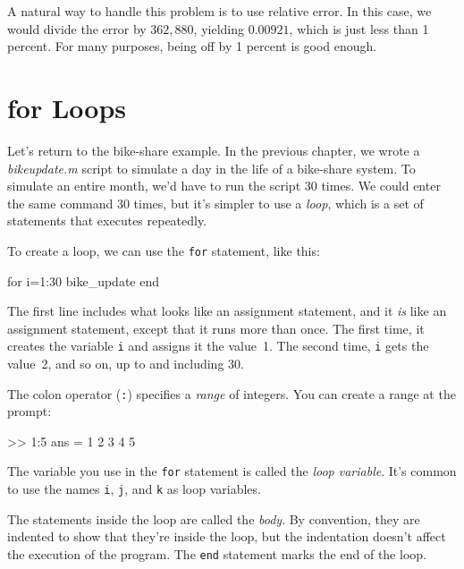 A natural way to handle this problem is to use relative
error.
In this case, we would divide the error
by $362,880$, yielding $0.00921$, which is just less than 1 percent.
For many purposes, being off by 1 percent is good enough.


\section{for Loops}


Let's return to the bike-share example. 
In the previous chapter, we wrote a \emph{bike\textunderscore update.m} script to simulate a
day in the life of a bike-share system. To simulate an entire
month, we'd have to run the script 30 times. We could enter the same command 30 times, but it's simpler to use a \emph{loop}, which is a set of statements that executes repeatedly.

To create a loop, we can use the \lstinline{for} statement, like this:

\begin{code}
for i=1:30
    bike_update
end
\end{code}

The first line includes what looks like an assignment statement, and it \emph{is}
like an assignment statement, except that it runs more than once.  The
first time, it creates the variable \lstinline{i} and assigns it the
value~1.  The second time, \lstinline{i} gets the value~2, and so on, up to
and including 30.


The colon operator (\lstinline{:}) specifies a \emph{range} of integers.
You can create a range at the prompt:

\begin{code}
>> 1:5
ans =  1     2     3     4     5
\end{code}

The variable you use in the \lstinline{for} statement is called the \emph{loop
variable}.  It's common to use the names \lstinline{i},
\lstinline{j}, and \lstinline{k} as loop variables.


The statements inside the loop are called the \emph{body}.  By convention,
they are indented to show that they're inside the loop, but the
indentation doesn't affect the execution of the program.
The \lstinline{end} statement marks the end of the loop.

